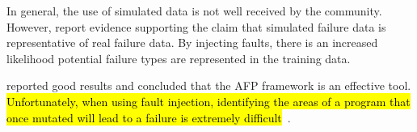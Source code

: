 In general, the use of simulated data is not well received by the community.
However, \citet{irrera2010,irrera2014} report evidence supporting the claim
that simulated failure data is representative of real failure data.  By
injecting faults, there is an increased likelihood potential failure types are
represented in the training data.

\citet{irrera2015} reported good results and concluded that the \ac{AFP}
framework is an effective tool.  \hl{Unfortunately, when using fault injection,
identifying the areas of a program that once mutated will lead to a failure is
extremely difficult}~\citep{irrera2010,kikuchi2014}.
